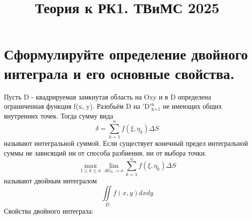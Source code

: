 \documentclass{article}
\begin{document}
\title{Теория к РК1. ТВиМС 2025}
\maketitle
\section{Сформулируйте определение двойного интеграла и его основные свойства.}
Пусть D - квадрируемая замкнутая область на Oxy и в D определена ограниченная функция f(x, y). Разобьём D на $\text{'{D}'}^\text{n}_\text{k=1}$ не имеющих общих внутренних точек. Тогда сумму вида
\begin{equation}
  \delta = \sum_{k=1}^{n} f(\xi, \eta_k) \Delta{S}
\end{equation}
называют интегральной суммой.
Если существует конечный предел интегральной суммы не зависящий ни от способа разбиения, ни от выбора точки.
\begin{equation}
  \max\limits_\text{$1 \leq k \leq n$} \lim_{dG_k \to o} \sum_{k=1}^{n} f(\xi, \eta_k) \Delta{S}
\end{equation}
называют двойным интегралом
\begin{equation}
  \iint\limits_D f(x,y) dxdy
\end{equation}
Свойства двойного интеграла:
\end{document}
